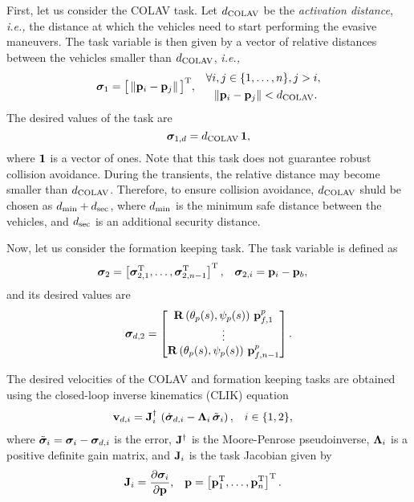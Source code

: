 First, let us consider the COLAV task.
Let {$d_{\rm COLAV}$} be the \emph{activation distance}, \emph{i.e.,} the distance at which the vehicles need to start performing the evasive maneuvers.
The task variable is then given by a vector of relative distances between the vehicles smaller than $d_{\rm COLAV}$, \emph{i.e.,}
\begin{align}
        \bm{\sigma}_1 &= \big[\left\|\mathbf{p}_i - \mathbf{p}_j\right\|\big]^{\mathrm{T}}, &
        \begin{split} 
            \forall &i,j\in\{1,\ldots,n\}, j > i, \\
            &\left\|\mathbf{p}_i - \mathbf{p}_j\right\| < d_{\rm COLAV}.
        \end{split}
\end{align}
The desired values of the task are
\begin{equation}
    \bm{\sigma}_{1,d} = d_{\rm COLAV} \, \mathbf{1},
\end{equation}
where $\mathbf{1}$ is a vector of ones.
Note that this task does not guarantee robust collision avoidance.
During the transients, the relative distance may become smaller than $d_{\rm COLAV}$.
Therefore, to ensure collision avoidance, $d_{\rm COLAV}$ shuld be chosen as $d_{\rm min} + d_{\rm sec}$, where $d_{\rm min}$ is the minimum safe distance between the vehicles, and $d_{\rm sec}$ is an additional security distance.

Now, let us consider the formation keeping task.
The task variable is defined as
\begin{align}
    \bm{\sigma}_2 &= \left[\bm{\sigma}_{2,1}^{\mathrm{T}}, \ldots, \bm{\sigma}_{2,n-1}^{\mathrm{T}}\right]^{\mathrm{T}}, \label{eq:nsb_5dof_sigma_2} &
    \bm{\sigma}_{2,i} &= \mathbf{p}_i - \mathbf{p}_b,
\end{align}
and its desired values are
\begin{equation}
    \bm{\sigma}_{d,2} = \begin{bmatrix}
        \mathbf{R}\left(\theta_p(s), \psi_p(s)\right)\,\mathbf{p}_{f,1}^p \\
        \vdots \\
        \mathbf{R}\left(\theta_p(s), \psi_p(s)\right)\,\mathbf{p}_{f,n-1}^p
    \end{bmatrix}. \label{eq:nsb_5dof_sigma_d_2}
\end{equation}

The desired velocities of the COLAV and formation keeping tasks are obtained using the closed-loop inverse kinematics (CLIK) equation \cite{arrichiello_formation_2006}
\begin{align}
    \mathbf{v}_{d,i} &= \mathbf{J}_i^{\dagger}\,\left(\dot{\bm{\sigma}}_{d,i} - \bm{\Lambda}_i\,\tilde{\bm{\sigma}}_i\right), &
    i &\in \{1,2\}, \label{eq:nsb_5dof_CLIK}
\end{align}
where $\tilde{\bm{\sigma}}_i = \bm{\sigma}_i - \bm{\sigma}_{d,i}$ is the error, $\mathbf{J}^{\dagger}$ is the Moore-Penrose pseudoinverse, $\mathbf{\Lambda}_i$ is a positive definite gain matrix, and $\mathbf{J}_i$ is the task Jacobian given by
\begin{align}
    \mathbf{J}_i &= \frac{\partial \bm{\sigma}_i}{\partial \mathbf{p}}, &
    \mathbf{p} &= \left[\mathbf{p}_1^{\mathrm{T}}, \ldots, \mathbf{p}_n^{\mathrm{T}}\right]^{\mathrm{T}}.
\end{align}

